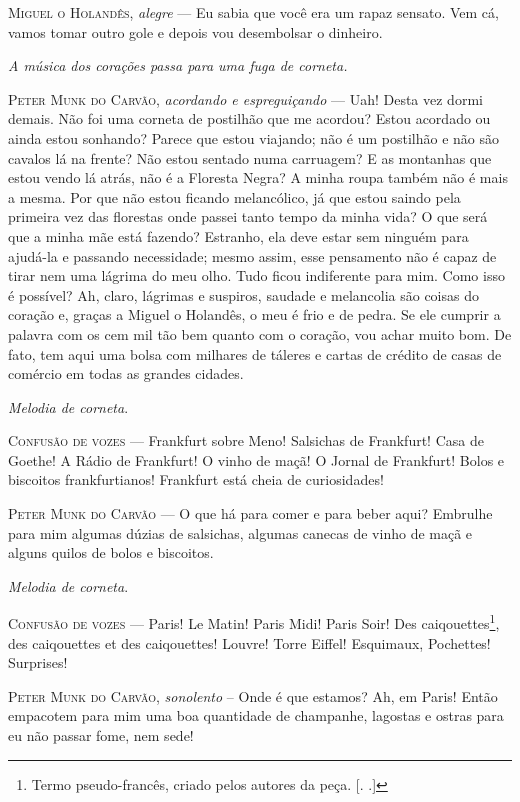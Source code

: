 \begin{myparindent}{0pt}
\begin{Parskip}
\textsc{Miguel o Holandês}, \emph{alegre} --- Eu sabia que você era um rapaz
sensato. Vem cá, vamos tomar outro gole e depois vou desembolsar o
dinheiro.

\emph{A música dos corações passa para uma fuga de corneta.}

\textsc{Peter Munk do Carvão}, \emph{acordando e espreguiçando} --- Uah! Desta vez
dormi demais. Não foi uma corneta de postilhão que me acordou? Estou
acordado ou ainda estou sonhando? Parece que estou viajando; não é um
postilhão e não são cavalos lá na frente? Não estou sentado numa
carruagem? E as montanhas que estou vendo lá atrás, não é a Floresta
Negra? A minha roupa também não é mais a mesma. Por que não estou
ficando melancólico, já que estou saindo pela primeira vez das florestas
onde passei tanto tempo da minha vida? O que será que a minha mãe está
fazendo? Estranho, ela deve estar sem ninguém para ajudá-la e passando
necessidade; mesmo assim, esse pensamento não é capaz de tirar nem uma
lágrima do meu olho. Tudo ficou indiferente para mim. Como isso é
possível? Ah, claro, lágrimas e suspiros, saudade e melancolia são
coisas do coração e, graças a Miguel o Holandês, o meu é frio e de
pedra. Se ele cumprir a palavra com os cem mil tão bem quanto com o
coração, vou achar muito bom. De fato, tem aqui uma bolsa com milhares
de táleres e cartas de crédito de casas de comércio em todas as grandes
cidades.

\emph{Melodia de corneta}.

\textsc{Confusão de vozes} --- Frankfurt sobre Meno! Salsichas de Frankfurt! Casa
de Goethe! A Rádio de Frankfurt! O vinho de maçã! O Jornal de Frankfurt!
Bolos e biscoitos frankfurtianos! Frankfurt está cheia de curiosidades!

\textsc{Peter Munk do Carvão} --- O que há para comer e para beber aqui? Embrulhe
para mim algumas dúzias de salsichas, algumas canecas de vinho de maçã e
alguns quilos de bolos e biscoitos.

\emph{Melodia de corneta}.

\textsc{Confusão de vozes} --- Paris! Le Matin! Paris Midi! Paris Soir! Des
caiqouettes\footnote{Termo pseudo-francês, criado pelos autores da peça.
  [. .]}, des caiqouettes et des caiqouettes! Louvre! Torre
Eiffel! Esquimaux, Pochettes! Surprises!

\textsc{Peter Munk do Carvão}, \emph{sonolento} -- Onde é que estamos? Ah, em
Paris! Então empacotem para mim uma boa quantidade de champanhe,
lagostas e ostras para eu não passar fome, nem sede!


\end{Parskip}
\end{myparindent}

